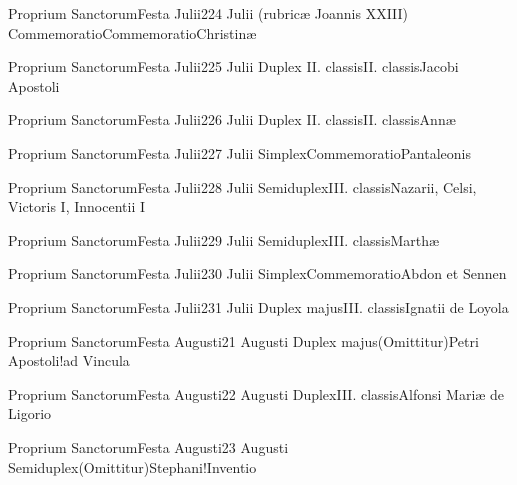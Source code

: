 \documentclass[invitatoriale-romanum.tex]{subfiles}
\begin{document}
	{Proprium Sanctorum}{Festa Julii}{2}{24 Julii (rubricæ Joannis XXIII)}
	{Commemoratio}{Commemoratio}{Christinæ}
	{}
	{}
\invitferia

	{Proprium Sanctorum}{Festa Julii}{2}{25 Julii}
	{Duplex II. classis}{II. classis}{Jacobi Apostoli}
	{}
	{}

	{Proprium Sanctorum}{Festa Julii}{2}{26 Julii}
	{Duplex II. classis}{II. classis}{Annæ}
	{}
	{}

	{Proprium Sanctorum}{Festa Julii}{2}{27 Julii}
	{Simplex}{Commemoratio}{Pantaleonis}
	{}
	{\invitferia}


	{Proprium Sanctorum}{Festa Julii}{2}{28 Julii}
	{Semiduplex}{III. classis}{Nazarii, Celsi, Victoris I, Innocentii I}
	{}
	{}

	{Proprium Sanctorum}{Festa Julii}{2}{29 Julii}
	{Semiduplex}{III. classis}{Marthæ}
	{}
	{}

	{Proprium Sanctorum}{Festa Julii}{2}{30 Julii}
	{Simplex}{Commemoratio}{Abdon et Sennen}
	{}
	{\invitferia}

	{Proprium Sanctorum}{Festa Julii}{2}{31 Julii}
	{Duplex majus}{III. classis}{Ignatii de Loyola}
	{}
	{}


	{Proprium Sanctorum}{Festa Augusti}{2}{1 Augusti}
	{Duplex majus}{(Omittitur)}{Petri Apostoli!ad Vincula}
	{}
	{\invitferia}

	{Proprium Sanctorum}{Festa Augusti}{2}{2 Augusti}
	{Duplex}{III. classis}{Alfonsi Mariæ de Ligorio}
	{}
	{}

	{Proprium Sanctorum}{Festa Augusti}{2}{3 Augusti}
	{Semiduplex}{(Omittitur)}{Stephani!Inventio}
	{}
	{\invitferia}
\end{document}

